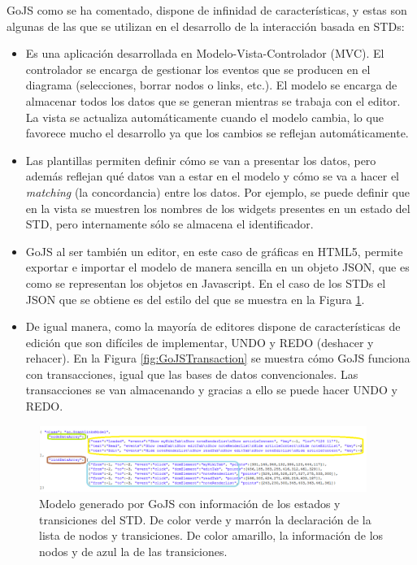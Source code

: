 GoJS como se ha comentado, dispone de infinidad de características, y estas son algunas de las que se utilizan en el desarrollo de la interacción basada en STDs:
\begin{itemize}
\item{Es una aplicación desarrollada en Modelo-Vista-Controlador (MVC). El controlador se encarga de gestionar los eventos que se producen en el diagrama (selecciones, borrar nodos o links, etc.). El modelo se encarga de almacenar todos los datos que se generan mientras se trabaja con el editor. La vista se actualiza automáticamente cuando el modelo cambia, lo que favorece mucho el desarrollo ya que los cambios se reflejan automáticamente.}
\item{Las plantillas permiten definir cómo se van a presentar los datos, pero además reflejan qué datos van a estar en el modelo y cómo se va a hacer el \emph{matching} (la concordancia) entre los datos. Por ejemplo, se puede definir que en la vista se muestren los nombres de los widgets presentes en un estado del STD, pero internamente sólo se almacena el identificador.}
\item{GoJS al ser también un editor, en este caso de gráficas en HTML5, permite exportar e importar el modelo de manera sencilla en un objeto JSON, que es como se representan los objetos en Javascript. En el caso de los STDs el JSON que se obtiene es del estilo del que se muestra en la Figura \ref{fig:GoJSModelJSON}}.
\item{De igual manera, como la mayoría de editores dispone de características de edición que son difíciles de implementar, UNDO y REDO (deshacer y rehacer). En la Figura \ref{fig:GoJSTransaction} se muestra cómo GoJS funciona con transacciones, igual que las bases de datos convencionales. Las transacciones se van almacenando y gracias a ello se puede hacer UNDO y REDO.}
\end{itemize}

\begin{figure}
\begin{center}
\includegraphics[width=0.95\textwidth]{figs/4-GoJSModelJSON.png}
\caption[Modelo generado por GoJS con información de los estados y transiciones del STD.]{Modelo generado por GoJS con información de los estados y transiciones del STD. De color verde y marrón la declaración de la lista de nodos y transiciones. De color amarillo, la información de los nodos y de azul la de las transiciones.}
\label{fig:GoJSModelJSON}
\end{center}
\end{figure}

